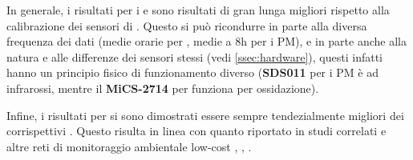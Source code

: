 In generale, i risultati per i  e  sono risultati di gran lunga migliori rispetto alla calibrazione dei sensori di . Questo si può ricondurre in parte alla diversa frequenza dei dati (medie orarie per , medie a 8h per i PM), e in parte anche alla natura e alle differenze dei sensori stessi (vedi \ref{ssec:hardware}), questi infatti hanno un principio fisico di funzionamento diverso (\textbf{SDS011} per i PM è ad infrarossi, mentre il \textbf{MiCS-2714} per  funziona per ossidazione).

Infine, i risultati per  si sono dimostrati essere sempre tendezialmente migliori dei corrispettivi . Questo risulta in linea con quanto riportato in studi correlati \cite{s18092843} e altre reti di monitoraggio ambientale low-cost \cite{eval_zikova}, \cite{s17081805}, \cite{s17081922}.



